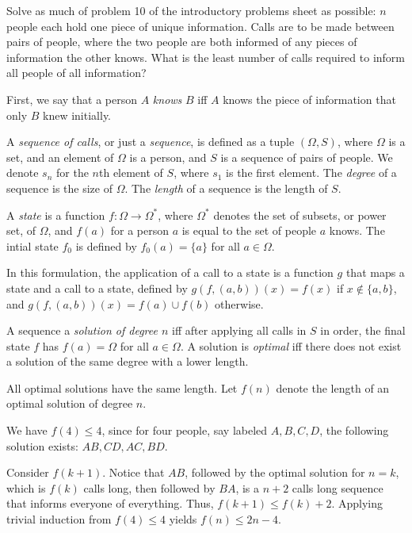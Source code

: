 \documentclass[11pt]{article}
\begin{document}
\newpage
\begin{question}
    Solve as much of problem 10 of the introductory problems sheet as possible:
    $n$ people each hold one piece of unique information.
    Calls are to be made between pairs of people, where
    the two people are both informed of any pieces of information
    the other knows.
    What is the least number of calls required to inform
    all people of all information?
\end{question}

First, we say that a person $A$ \emph{knows} $B$ iff
$A$ knows the piece of information that only $B$ knew initially.

A \emph{sequence of calls}, or just a \emph{sequence},
is defined as a tuple $(\Omega, S)$,
where $\Omega$ is a set, and an element of $\Omega$ is a person,
and $S$ is a sequence of pairs of people.
We denote $s_n$ for the $n$th element of $S$, where $s_{1}$ is the first element.
The \emph{degree} of a sequence is the size of $\Omega$.
The \emph{length} of a sequence is the length of $S$.

A \emph{state} is a function $f : \Omega \to \Omega^{*}$,
where $\Omega^{*}$ denotes the set of subsets, or power set, of $\Omega$,
and $f(a)$ for a person $a$ is equal to the set of people $a$ knows.
The intial state $f_{0}$ is defined by $f_{0}(a) = \{a\}$ for all $a \in \Omega$.

In this formulation, the application of a call to a state
is a function $g$ that maps a state and a call to a state,
defined by $g(f,(a,b))(x) = f(x)$ if $x \notin \{a,b\}$,
and $g(f,(a,b))(x) = f(a) \cup f(b)$ otherwise.

A sequence a \emph{solution of degree $n$} iff
after applying all calls in $S$ in order,
the final state $f$ has $f(a) = \Omega$ for all $a \in \Omega$.
A solution is \emph{optimal} iff there does not exist
a solution of the same degree with a lower length.

All optimal solutions have the same length.
Let $f(n)$ denote the length of an optimal solution of degree $n$.

We have $f(4) \le 4$, since for four people,
say labeled $A,B,C,D$, the following solution exists: $AB, CD, AC, BD$.

Consider $f(k+1)$.
Notice that $AB$, followed by the optimal solution
for $n=k$, which is $f(k)$ calls long, then followed by $BA$,
is a $n+2$ calls long sequence that informs everyone of everything.
Thus, $f(k+1) \le f(k) + 2$.
Applying trivial induction from $f(4) \le 4$ yields $f(n) \le 2n - 4$.
\end{document}
